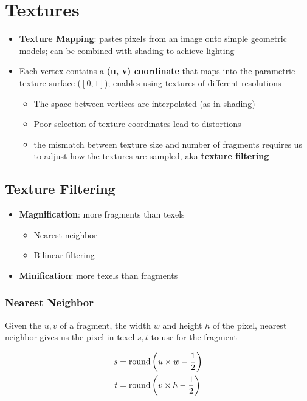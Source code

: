 \chapter{Textures}

\begin{itemize}
  \item \textbf{Texture Mapping}: pastes pixels from an image onto
  simple geometric models; can be combined with shading to achieve lighting
  \item Each vertex contains a \textbf{(u, v) coordinate} that maps into the
  parametric texture surface ($ \left[ 0, 1 \right] $); enables using
  textures of different resolutions
  \begin{itemize}
    \item The space between vertices are interpolated (as in shading)
    \item Poor selection of texture coordinates lead to distortions
    \item the mismatch between texture size and number of fragments requires us
    to adjust how the textures are sampled, aka \textbf{texture filtering}
  \end{itemize}
\end{itemize}

\section{Texture Filtering}

  \begin{itemize}
    \item \textbf{Magnification}: more fragments than texels
    \begin{itemize}
      \item Nearest neighbor
      \item Bilinear filtering
    \end{itemize}
    \item \textbf{Minification}: more texels than fragments
  \end{itemize}

  \subsection{Nearest Neighbor}

    Given the $ u, v $ of a fragment, the width $ w $ and height $ h $ of the
    pixel, nearest neighbor gives us the pixel in texel $ s, t $ to use for
    the fragment

    \begin{align}
      s &= \operatorname{round}\left( u \times w - \frac{1}{2} \right) \\
      t &= \operatorname{round}\left( v \times h - \frac{1}{2} \right)
    \end{align}

